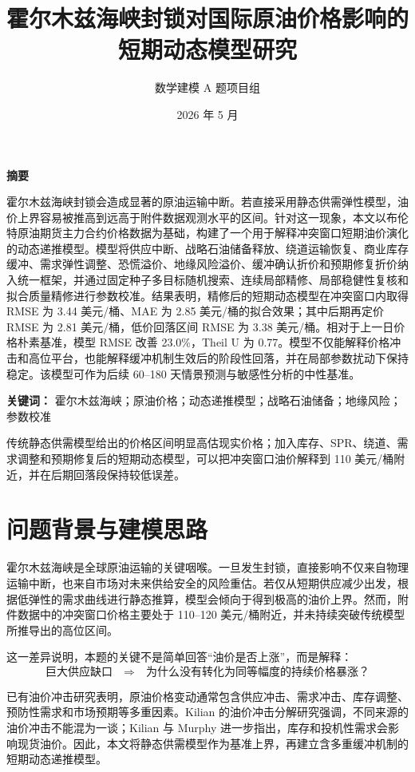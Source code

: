 \documentclass[UTF8,zihao=-4,fontset=fandol]{ctexart}
\title{\bfseries 霍尔木兹海峡封锁对国际原油价格影响的短期动态模型研究}
\author{数学建模 A 题项目组}
\date{2026 年 5 月}
\begin{document}
\maketitle

\begin{center}
\textbf{摘\quad 要}
\end{center}

霍尔木兹海峡封锁会造成显著的原油运输中断。若直接采用静态供需弹性模型，油价上界容易被推高到远高于附件数据观测水平的区间。针对这一现象，本文以布伦特原油期货主力合约价格数据为基础，构建了一个用于解释冲突窗口短期油价演化的动态递推模型。模型将供应中断、战略石油储备释放、绕道运输恢复、商业库存缓冲、需求弹性调整、恐慌溢价、地缘风险溢价、缓冲确认折价和预期修复折价纳入统一框架，并通过固定种子多目标随机搜索、连续局部精修、局部稳健性复核和拟合质量精修进行参数校准。结果表明，精修后的短期动态模型在冲突窗口内取得 RMSE 为 3.44 美元/桶、MAE 为 2.85 美元/桶的拟合效果；其中后期再定价 RMSE 为 2.81 美元/桶，低价回落区间 RMSE 为 3.38 美元/桶。相对于上一日价格朴素基准，模型 RMSE 改善 23.0\%，Theil U 为 0.77。模型不仅能解释价格冲击和高位平台，也能解释缓冲机制生效后的阶段性回落，并在局部参数扰动下保持稳定。该模型可作为后续 60--180 天情景预测与敏感性分析的中性基准。

\textbf{关键词：} 霍尔木兹海峡；原油价格；动态递推模型；战略石油储备；地缘风险；参数校准

\begin{tcolorbox}[colback=OilLight,colframe=OilBlue,title=核心结论]
传统静态供需模型给出的价格区间明显高估现实价格；加入库存、SPR、绕道、需求调整和预期修复后的短期动态模型，可以把冲突窗口油价解释到 110 美元/桶附近，并在后期回落段保持较低误差。
\end{tcolorbox}

\section{问题背景与建模思路}

霍尔木兹海峡是全球原油运输的关键咽喉。一旦发生封锁，直接影响不仅来自物理运输中断，也来自市场对未来供给安全的风险重估。若仅从短期供应减少出发，根据低弹性的需求曲线进行静态推算，模型会倾向于得到极高的油价上界。然而，附件数据中的冲突窗口价格主要处于 110--120 美元/桶附近，并未持续突破传统模型所推导出的高位区间。

这一差异说明，本题的关键不是简单回答“油价是否上涨”，而是解释：
\[
\text{巨大供应缺口} \quad \Longrightarrow \quad \text{为什么没有转化为同等幅度的持续价格暴涨？}
\]

已有油价冲击研究表明，原油价格变动通常包含供应冲击、需求冲击、库存调整、预防性需求和市场预期等多重因素。Kilian 的油价冲击分解研究强调，不同来源的油价冲击不能混为一谈；Kilian 与 Murphy 进一步指出，库存和投机性需求会影响现货油价。因此，本文将静态供需模型作为基准上界，再建立含多重缓冲机制的短期动态递推模型。
\end{document}
